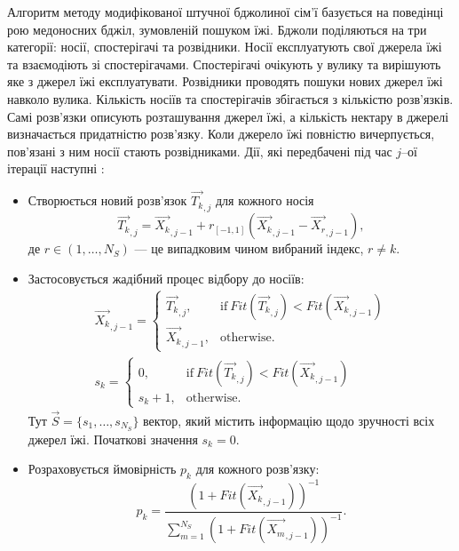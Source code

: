 Алгоритм методу модифікованої штучної бджолиної сім'ї базується на поведінці рою медоносних бджіл, зумовленій пошуком їжі.
Бджоли поділяються на три категорії: носії, спостерігачі та розвідники.
Носії експлуатують свої джерела їжі та взаємодіють зі спостерігачами.
Спостерігачі очікують у вулику та вирішують яке з джерел їжі експлуатувати.
Розвідники проводять пошуки нових джерел їжі навколо вулика.
Кількість носіїв та спостерігачів збігається з кількістю розв'язків.
Самі розв'язки описують розташування джерел їжі, а кількість нектару в джерелі визначається придатністю розв'язку.
Коли джерело їжі повністю вичерпується, пов'язані з ним носії стають розвідниками.
Дії, які передбачені під час $j$--ої ітерації наступні \cite{MABC}:
\begin{itemize}[leftmargin=0cm,itemindent=1em]
  \item Створюється новий розв'язок $\overrightarrow{T_{k}}_{,j}$ для кожного носія
 \begin{equation}
 \label{eqMABCNew}
 \overrightarrow{T_{k}}_{,j}=\overrightarrow{X_{k}}_{,j-1}+r_{[-1,1]}(\overrightarrow{X_{k}}_{,j-1}-\overrightarrow{X_{r}}_{,j-1}),
 \end{equation}
 де
 $r\in(1,\ldots,N_S)$ --- це випадковим чином вибраний індекс, $r\neq k$.
  \item Застосовується жадібний процес відбору до носіїв:
 \begin{eqnarray}
 \label{eqMABC_GS1}
 \overrightarrow{X_{k}}_{,j-1}=\left\{
 \begin{array}{ll}
\overrightarrow{T_{k}}_{,j},& \text{if} \: Fit(\overrightarrow{T_k}_{,j})<Fit(\overrightarrow{X_k}_{,j-1})\\
 \overrightarrow{X_{k}}_{,j-1},& \text{otherwise}.
 \end{array}
 \right.
 \\
 \label{eqMABC_GS2}
 s_k=\left\{
 \begin{array}{ll}
0,& \text{if} \: Fit(\overrightarrow{T_k}_{,j})<Fit(\overrightarrow{X_k}_{,j-1})\\
s_k+1 ,& \text{otherwise}.
 \end{array}
 \right.
 \end{eqnarray}
 Тут $\overrightarrow{S}=\{s_1,\ldots,s_{N_S}\}$ вектор, який містить інформацію щодо зручності всіх джерел їжі.
 Початкові значення $s_k=0$.

 \item Розраховується ймовірність $p_k$ для кожного розв'язку:
 \begin{equation}
 \label{eqMABCP}
 p_k=\frac{(1+ Fit(\overrightarrow{X_k}_{,j-1}))^{-1}}{\sum_{m=1}^{N_S}(1+ Fit(\overrightarrow{X_m}_{,j-1}))^{-1}}.
  \end{equation}


\end{itemize}
